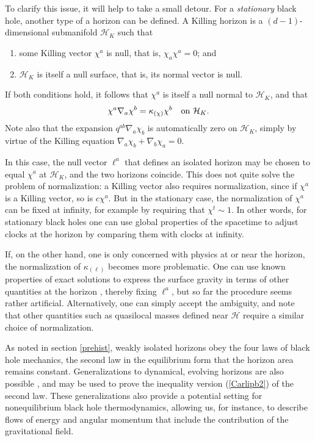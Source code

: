 \documentclass[11pt]{article}
\begin{document}
\begin{appendix}
To clarify this issue, it will help to take a small detour.  For a 
\emph{stationary} black hole, another type of a horizon can be 
defined.  A Killing horizon is a $(d-1)$-dimensional submanifold 
$\mathcal{H}_K$ such that 
\begin{enumerate}
\item some Killing vector $\chi^a$ is null, that is, $\chi_a\chi^a=0$;
and
\item $\mathcal{H}_K$ is itself a null surface, that is, its normal
vector is null.  
\end{enumerate}
If both conditions hold, it follows that $\chi^a$ is itself a null 
normal to $\mathcal{H}_K$, and that
\begin{align}
\chi^a\nabla_a\chi^b = \kappa_{(\chi)}\chi^b 
\quad\hbox{on $\mathcal{H}_K$} .
\end{align}
Note also that the expansion $q^{ab}\nabla_a\chi_b$ is automatically
zero on $\mathcal{H}_K$, simply by virtue of the Killing equation
$\nabla_a\chi_b + \nabla_b\chi_a=0$.

In this case, the null vector $\ell^a$ that defines an isolated horizon
may be chosen to equal $\chi^a$ at $\mathcal{H}_K$, and the
two horizons coincide.  This does not quite solve the problem
of normalization: a Killing vector also requires normalization,
since if $\chi^a$ is a Killing vector, so is $c\chi^a$.  But in the
stationary case, the normalization of $\chi^a$ can be fixed at
infinity, for example by requiring that $\chi^t\sim1$.  In other
words, for stationary black holes one can use global properties 
of the spacetime to adjust clocks at the horizon by comparing 
them with clocks at infinity.  

If, on the other hand, one is only concerned with physics at or 
near the horizon, the normalization of $\kappa_{(\ell)}$ becomes 
more problematic.  One can use known properties of exact solutions 
to express the surface gravity in terms of other quantities at the 
horizon \cite{AshKrish}, thereby fixing $\ell^a$, but so far the 
procedure seems rather artificial.  Alternatively, one can simply
accept the ambiguity, and note that other quantities such as
quasilocal masses defined near $\mathcal{H}$ require a
similar choice of normalization.

As noted in section \ref{prehist}, weakly isolated horizons obey 
the four laws of black hole mechanics, the second law in the  
equilibrium form that the horizon area remains constant.  Generalizations
to dynamical, evolving horizons are also possible \cite{AshKrish}, 
and may be used to prove the inequality version (\ref{Carlipb2})
of the second law.  These generalizations also
provide a potential setting for nonequilibrium black hole 
thermodynamics, allowing us, for instance, to describe  
flows of energy and angular momentum that include the 
contribution of the gravitational field.

\end{appendix}
\end{document}
